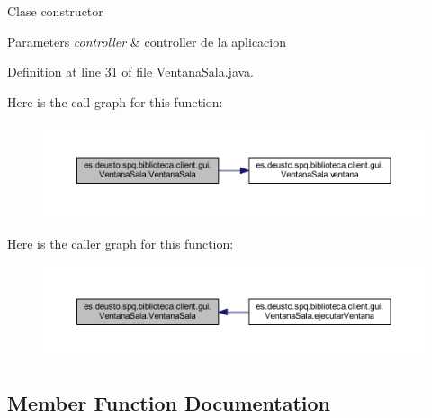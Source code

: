 Clase constructor 
\begin{DoxyParams}{Parameters}
{\em controller} & controller de la aplicacion \\
\hline
\end{DoxyParams}


Definition at line 31 of file Ventana\+Sala.\+java.

Here is the call graph for this function\+:
\nopagebreak
\begin{figure}[H]
\begin{center}
\leavevmode
\includegraphics[width=350pt]{classes_1_1deusto_1_1spq_1_1biblioteca_1_1client_1_1gui_1_1_ventana_sala_a2e6af4bf083878d6e378cb7280a7f80b_cgraph}
\end{center}
\end{figure}
Here is the caller graph for this function\+:
\nopagebreak
\begin{figure}[H]
\begin{center}
\leavevmode
\includegraphics[width=350pt]{classes_1_1deusto_1_1spq_1_1biblioteca_1_1client_1_1gui_1_1_ventana_sala_a2e6af4bf083878d6e378cb7280a7f80b_icgraph}
\end{center}
\end{figure}


\subsection{Member Function Documentation}
\mbox{\label{classes_1_1deusto_1_1spq_1_1biblioteca_1_1client_1_1gui_1_1_ventana_sala_a651e8570ad62b5a769b2e45e51291694}} 
